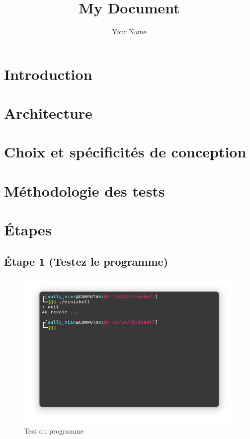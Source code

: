 \documentclass{article}
\title{My Document}
\author{Your Name}
\begin{document}
\maketitle
\tableofcontents

\section{Introduction}


\section{Architecture}


\section{Choix et spécificités de conception}


\section{Méthodologie des tests}


\section{Étapes}

\subsection*{Étape 1 (Testez le programme)}

\begin{figure}[H]
    \centering
    \includegraphics[width=1\textwidth]{./resources/E1.png}
    \caption{Test du programme}
    \label{fig:E1}
\end{figure}
\end{document}

